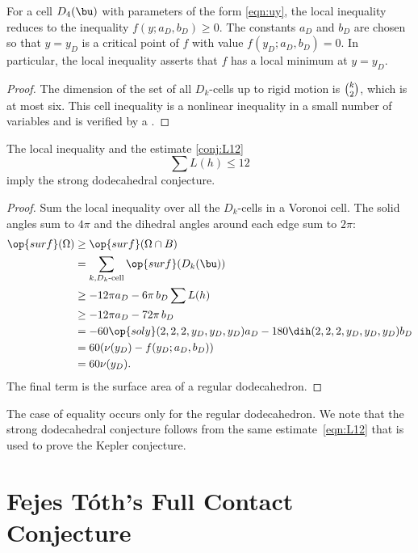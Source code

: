 For a cell $D_4(\bu)$ with parameters of the form
  \eqref{eqn:uy}, the local inequality reduces to the inequality
  $f(y;a_D,b_D)\ge 0$.  The constants $a_D$ and $b_D$ are chosen so that
  $y=y_D$ is a critical point of $f$ with value $f(y_D;a_D,b_D)=0$.  In
  particular, the local inequality asserts that $f$ has a local
  minimum at $y=y_D$.


\begin{proof} 
  The dimension of the set of all $D_k$-cells up to rigid motion 
is $\tbinom{k}{2}$, which is at most six.  
This cell inequality is a nonlinear inequality in a small number of variables
and is verified by a 
.  %
\end{proof}

\begin{lemma}[]
  The local inequality and the estimate \eqref{conj:L12}
\[
\sum L(h) \le 12
\]
imply the strong dodecahedral conjecture.
\end{lemma}

\begin{proof} 
  Sum the local inequality over all the $D_k$-cells in a Voronoi cell.
  The solid angles sum to $4\pi$ and the dihedral angles around each
  edge sum to $2\pi$:
\begin{align*}
  \op{surf}(\Omega) &\ge \op{surf}(\Omega\cap B)\\
  &=\sum_{k,D_k\text{-cell}} \op{surf}(D_k(\bu))\\
  &\ge -12\pi a_D - 6\pi\, b_D  \sum L(h)\\
  &\ge -12\pi a_D - 72\pi\, b_D\\
  &= -60 \op{soly}(2,2,2,y_D,y_D,y_D) a_D - 180 \dih(2,2,2,y_D,y_D,y_D) b_D\\
  &= 60 (\nu(y_D) - f(y_D;a_D,b_D))\\
  &= 60 \nu(y_D).\\
\end{align*}
The final term is the surface area of a regular dodecahedron.
\end{proof}

The case of equality occurs only for the regular dodecahedron.
We note that the strong dodecahedral conjecture follows from the same
estimate~\eqref{eqn:L12} that is used to prove the Kepler conjecture.


\newpage
\section{Fejes T\'oth's Full Contact Conjecture}


